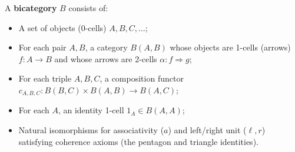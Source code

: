 A \textbf{bicategory} $B$ consists of:
\begin{itemize}
\item A set of objects (0-cells) $A, B, C, \ldots$;
\item For each pair $A, B$, a category $B(A, B)$ whose objects are 1-cells (arrows) $f: A \rightarrow B$ and whose arrows are 2-cells $\alpha: f \Rightarrow g$;
\item For each triple $A, B, C$, a composition functor $c_{A,B,C}: B(B, C) \times B(A, B) \rightarrow B(A, C)$;
\item For each $A$, an identity 1-cell $1_A \in B(A, A)$;
\item Natural isomorphisms for associativity ($a$) and left/right unit ($\ell, r$) satisfying coherence axioms (the pentagon and triangle identities).
\end{itemize}